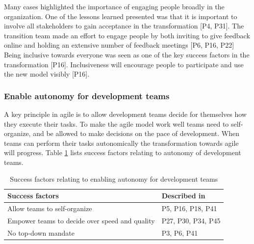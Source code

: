 \documentclass[preprint,authoryear,12pt]{elsarticle}
\begin{document}






Many cases highlighted the importance of engaging people broadly in the
organization.
One of the lessons learned presented was that it is important to involve all
stakeholders to gain acceptance in the transformation [P4, P31]. The transition
team made an effort to engage people by both inviting to give feedback online
and holding an extensive number of feedback meetings [P6, P16, P22] Being
inclusive towards everyone was seen as one of the key success factors in the
transformation [P16]. Inclusiveness will encourage people to participate and use
the new model visibly [P16].


\subsubsection{Enable autonomy for development teams}

A key principle in agile is to allow development teams decide for themselves how
they execute their tasks. To make the agile model work well teams need to
self-organize, and be allowed to make decisions on the pace of development.
When teams can perform their tasks autonomically the transformation towards
agile will progress.
Table \ref{table:success_autonomy} lists success factors relating to autonomy of
development teams.

\begin{table}[h]
    \centering
    \begin{tabular}{ >{\raggedright\arraybackslash}p{}
                     >{\raggedright\arraybackslash}p{} }
        \toprule
        Success factors  &  Described in \\
        \midrule
        Allow teams to self-organize  &
                P5, P16, P18, P41  \\
        Empower teams to decide over speed and quality  &
                P27, P30, P34, P45  \\
        No top-down mandate  &
                P3, P6, P41  \\
        \bottomrule
    \end{tabular}
    \caption{Success factors relating to enabling autonomy for development teams}
    \label{table:success_autonomy}
\end{table}
\end{document}
